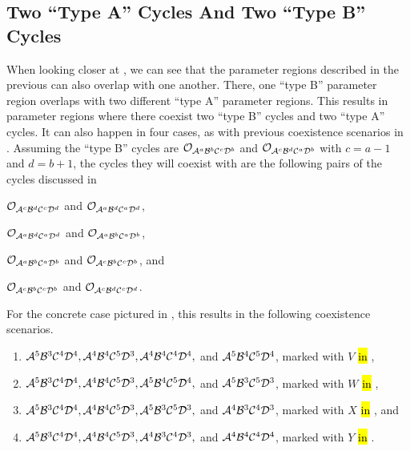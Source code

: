 \subsection{Two ``Type A'' Cycles And Two ``Type B'' Cycles}

When looking closer at , we can see that the parameter regions described in the previous  can also overlap with one another.
There, one ``type B'' parameter region overlaps with two different ``type A'' parameter regions.
This results in parameter regions where there coexist two ``type B'' cycles and two ``type A'' cycles.
It can also happen in four cases, as with previous coexistence scenarios in .
Assuming the ``type B'' cycles are $\Cycle{\A^a\B^b\C^c\D^b}$ and $\Cycle{\A^c\B^d\C^a\D^b}$ with $c = a - 1$ and $d = b + 1$, the cycles they will coexist with are the following pairs of the cycles discussed in 
\begin{enumerate*}
	\item $\Cycle{\A^c\B^d\C^c\D^d}$ and $\Cycle{\A^a\B^d\C^a\D^d}$,
	\item $\Cycle{\A^a\B^d\C^a\D^d}$ and $\Cycle{\A^a\B^b\C^a\D^b}$,
	\item $\Cycle{\A^a\B^b\C^a\D^b}$ and $\Cycle{\A^c\B^b\C^c\D^b}$, and
	\item $\Cycle{\A^c\B^b\C^c\D^b}$ and $\Cycle{\A^c\B^d\C^c\D^d}$.
\end{enumerate*}
For the concrete case pictured in , this results in the following coexistence scenarios.
\begin{enumerate}
	\item $\A^5\B^3\C^4\D^4, \A^4\B^4\C^5\D^3, \A^4\B^4\C^4\D^4,$ and $\A^5\B^4\C^5\D^4$, marked with $V$ \hl{in} ,
	\item $\A^5\B^3\C^4\D^4, \A^4\B^4\C^5\D^3, \A^5\B^4\C^5\D^4,$ and $\A^5\B^3\C^5\D^3$, marked with $W$ \hl{in} ,
	\item $\A^5\B^3\C^4\D^4, \A^4\B^4\C^5\D^3, \A^5\B^3\C^5\D^3,$ and $\A^4\B^3\C^4\D^3$, marked with $X$ \hl{in} , and
	\item $\A^5\B^3\C^4\D^4, \A^4\B^4\C^5\D^3, \A^4\B^3\C^4\D^3,$ and $\A^4\B^4\C^4\D^4$, marked with $Y$ \hl{in} .
\end{enumerate}

